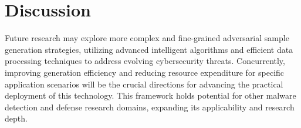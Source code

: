 \chapter{Discussion}

Future research may explore more complex and fine-grained adversarial sample generation strategies, utilizing advanced intelligent algorithms and efficient data processing techniques to address evolving cybersecurity threats. Concurrently, improving generation efficiency and reducing resource expenditure for specific application scenarios will be the crucial directions for advancing the practical deployment of this technology. This framework holds potential for other malware detection and defense research domains, expanding its applicability and research depth.